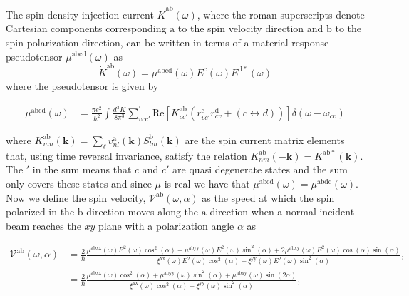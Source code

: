 \documentclass[prb,11pt,tightenlines,twocolumn,aps]{revtex4-1}
\begin{document}
The spin density injection current $\dot{K}^{\mathrm{ab}}(\omega)$, 
% 
{
\color{red}
where the
roman superscripts denote Cartesian components corresponding $\mathrm{a}$ to the
spin velocity direction and $\mathrm{b}$ to the spin polarization direction, can
be written in terms of a material response pseudotensor
$\mu^{\mathrm{abcd}}(\omega)$ as
}
\begin{equation*}
\dot{K}^{\mathrm{ab}}(\omega) = \mu^{\mathrm{abcd}}(\omega)
E^{\mathrm{c}}(\omega) E^{\mathrm{d*}}(\omega)
\label{eq:dotk}
\end{equation*}
where the pseudotensor is given by\cite{bhatPRL05}
\begin{widetext}
\begin{align}
\mu^{\mathrm{abcd}} (\omega) 
&=
\frac{\pi e^{2}}{\hbar^{2}} \int 
\frac{d^{3}K}{8 \pi^{3}}
\sum_{vcc'}^{'}
\mathrm{Re} \left[ K^{\mathrm{ab}}_{cc'} 
\left( 
r^{\mathrm{c}}_{vc'} 
r^{\mathrm{d}}_{cv } +
(c \leftrightarrow d)
\right) 
\right]
\delta(\omega-\omega_{cv})
\label{eq:mu}
\end{align}
\end{widetext}
{\color{red}
where $K^{\mathrm{ab}}_{mn}(\mathbf{k}) =
\sum_{\ell}v^{\mathrm{a}}_{nl}(\mathbf{k}) S^{\mathrm{b}}_{lm}(\mathbf{k})$ are
the spin current matrix elements that, using time reversal invariance, satisfy
the relation $K^{\mathrm{ab}}_{nm}(\mathbf{-k}) = K^{\mathrm{ab*}}(\mathbf{k})
$. 
}%
The $'$ in the sum means that $c$ and $c'$ are quasi degenerate states and
the sum only covers these states and 
{\color{red}
since $\mu$ is real we have that
$\mu^{\mathrm{abcd}}(\omega) = \mu^{\mathrm{abdc}}(\omega)$.
}
Now we define the spin velocity, $\mathcal{V}^{\mathrm{ab}}(\omega,\alpha)$ as
the speed at which the spin polarized in the $\mathrm{b}$   direction moves
along the $\mathrm{a}$ direction when a normal incident beam reaches the $xy$
plane with a polarization angle $\alpha$ as
\begin{widetext}
\begin{align}
\mathcal{V}^{\mathrm{ab}}(\omega,\alpha)
&= \frac{2}{\hbar}
\frac{\mu^{\mathrm{abxx}}(\omega)
E^{2}(\omega)\cos^{2}(\alpha) + 
\mu^{\mathrm{abyy}}(\omega)
E^{2}(\omega)\sin^{2}(\alpha) + 
2\mu^{\mathrm{abxy}}(\omega)
E^{2}(\omega)\cos(\alpha)\sin(\alpha)}
{\xi^{\mathrm{xx}}(\omega)
E^{2}(\omega)\cos^{2}(\alpha) + 
\xi^{\mathrm{yy}}(\omega)
E^{2}(\omega)\sin^{2}(\alpha)},
\nonumber \\
&= \frac{2}{\hbar}
\frac{\mu^{\mathrm{abxx}}(\omega)\cos^{2}(\alpha) + 
\mu^{\mathrm{abyy}}(\omega)\sin^{2}(\alpha) + 
\mu^{\mathrm{abxy}}(\omega)\sin(2\alpha)}
{\xi^{\mathrm{xx}}(\omega)\cos^{2}(\alpha) + 
\xi^{\mathrm{yy}}(\omega)\sin^{2}(\alpha)},
\label{eq:vab}
\end{align}
\end{widetext}
\end{document}
